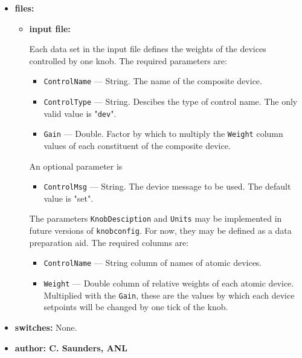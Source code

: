 \begin{itemize}
\item {\bf files:}
\begin{itemize}
\item {\bf input file:}\par
Each data set in the input file defines the weights of the devices controlled
by one knob. 
The required parameters are:
\begin{itemize}
        \item {\tt ControlName} --- String. The name of the composite device.
        \item {\tt ControlType} --- String. Descibes the type of control name.
                The only valid value is "\verb+dev+".
        \item {\tt Gain} --- Double. Factor by which to multiply the 
                {\tt Weight} column values of each constituent of the
                composite device.
\end{itemize}
An optional parameter is
\begin{itemize}
        \item {\tt ControlMsg} --- String. The device message to be used. The
        default value is "set".
\end{itemize}
The parameters \verb+KnobDesciption+ and \verb+Units+ may be implemented in future versions
of \verb+knobconfig+. For now, they may be defined as a data preparation aid.
The required columns are:
\begin{itemize}
        \item {\tt ControlName} --- String column of names of atomic devices.
        \item {\tt Weight} --- Double column of relative weights of each atomic device.
        Multiplied with the \verb+Gain+, these are the values by which each device
        setpoints will be changed by one tick of the knob.
\end{itemize}
\end{itemize}
%
\item {\bf switches:}
%
%
    None.

\item {\bf author: C. Saunders, ANL} 
\end{itemize}
